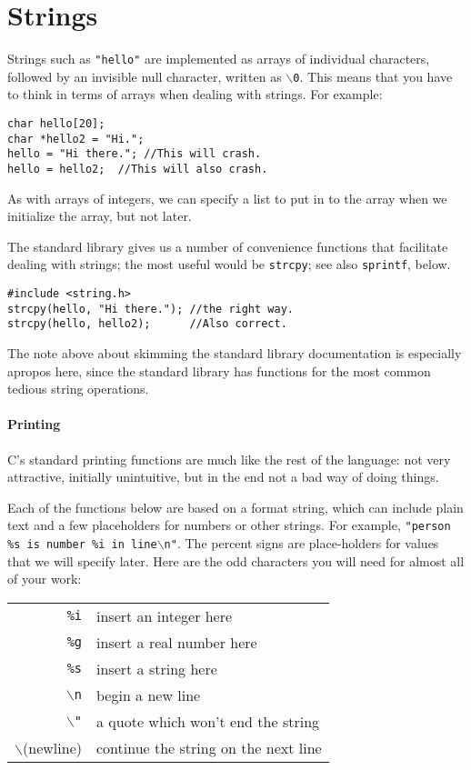 \documentclass[12pt]{article}
\begin{document}
\section{Strings} 

Strings such as {\tt "hello"} are implemented as arrays of individual characters, followed by an invisible
null character, written as {\tt $\backslash$0}. This means that you have to think in terms of arrays when dealing
with strings. For example:
\begin{verbatim}
char hello[20];
char *hello2 = "Hi.";
hello = "Hi there."; //This will crash.
hello = hello2;  //This will also crash.
\end{verbatim}

As with arrays of integers, we can specify a list to put in to the array when we initialize the array, but
not later.

The standard library gives us a number of convenience functions that facilitate dealing with strings; the
most useful would be {\tt strcpy}; see also {\tt sprintf}, below.
\begin{verbatim}
#include <string.h>
strcpy(hello, "Hi there."); //the right way.
strcpy(hello, hello2);      //Also correct.
\end{verbatim}

The note above about skimming the standard library documentation is especially apropos here, since the
standard library has functions for the most common tedious string operations.

\paragraph{Printing} 
C's standard printing functions are much like the rest of the language: not very attractive, initially
unintuitive, but in the end not a bad way of doing things. 

Each of the functions below are based on a
format string, which can include plain text and a few placeholders for numbers or other strings. For
example, {\tt "person \%s is number \%i in line$\backslash$n"}. The percent signs are place-holders for values that we
will specify later. Here are the odd characters you will need for almost all of your work:

\begin{tabular}{rl}
{\tt \%i}	& insert an integer here\\
{\tt \%g}	& insert a real number here\\
{\tt \%s}	& insert a string here\\
{\tt $\backslash$n}	& begin a new line\\
{\tt $\backslash$"}	& a quote which won't end the string\\
$\backslash$(newline)	& continue the string on the next line
\end{tabular}
\end{document}
